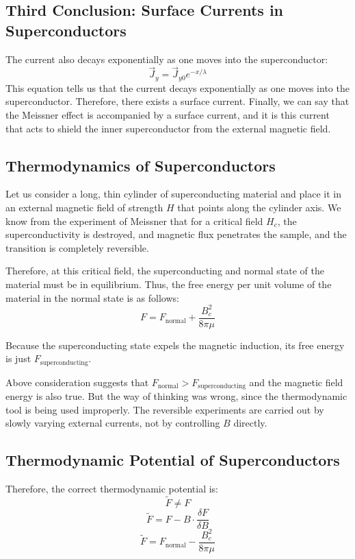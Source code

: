 \documentclass{article}
\begin{document}
\subsection{Third Conclusion: Surface Currents in Superconductors}

The current also decays exponentially as one moves into the superconductor:
\[
\vec{J}_y = \vec{J}_{y0} e^{-x/\lambda}
\]
This equation tells us that the current decays exponentially as one moves into the superconductor. Therefore, there exists a surface current. Finally, we can say that the Meissner effect is accompanied by a surface current, and it is this current that acts to shield the inner superconductor from the external magnetic field.

\subsection{Thermodynamics of Superconductors}

Let us consider a long, thin cylinder of superconducting material and place it in an external magnetic field of strength \(H\) that points along the cylinder axis. We know from the experiment of Meissner that for a critical field \(H_c\), the superconductivity is destroyed, and magnetic flux penetrates the sample, and the transition is completely reversible.

Therefore, at this critical field, the superconducting and normal state of the material must be in equilibrium. Thus, the free energy per unit volume of the material in the normal state is as follows:
\[
F = F_{\text{normal}} + \frac{B_c^2}{8 \pi \mu} \tag{15}
\]

Because the superconducting state expels the magnetic induction, its free energy is just \(F_{\text{superconducting}}\).

Above consideration suggests that \(F_{\text{normal}} > F_{\text{superconducting}}\) and the magnetic field energy is also true. But the way of thinking was wrong, since the thermodynamic tool is being used improperly. The reversible experiments are carried out by slowly varying external currents, not by controlling \(B\) directly.

\subsection{Thermodynamic Potential of Superconductors}

Therefore, the correct thermodynamic potential is:
\[
\tilde{F} \neq F
\]
\[
\tilde{F} = F - B \cdot \frac{\delta F}{\delta B}
\]
\[
\tilde{F} = F_{\text{normal}} - \frac{B_c^2}{8 \pi \mu} \tag{16}
\]
\end{document}
